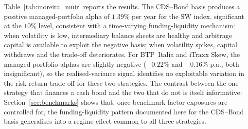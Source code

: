 Table~\ref{tab:moreira_muir} reports the results. The CDS--Bond basis
produces a positive managed-portfolio alpha of $1.39\%$ per year for
the SW index, significant at the $10\%$ level, consistent with a
time-varying funding-liquidity mechanism: when volatility is low,
intermediary balance sheets are healthy and arbitrage capital is
available to exploit the negative basis; when volatility spikes,
capital withdraws and the trade-off deteriorates. For BTP~Italia and
iTraxx Skew, the managed-portfolio alphas are slightly negative
($-0.22\%$ and $-0.16\%$ p.a., both insignificant), so the
realised-variance signal identifies no exploitable variation in the
risk-return trade-off for these two strategies. The contrast between
the one strategy that finances a cash bond and the two that do not is
itself informative: Section~\ref{sec:benchmarks} shows that, once
benchmark factor exposures are controlled for, the funding-liquidity
pattern documented here for the CDS--Bond basis generalises into a
regime effect common to all three strategies.
